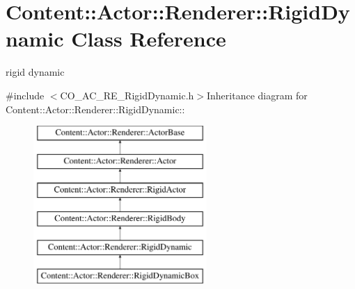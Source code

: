 \hypertarget{classContent_1_1Actor_1_1Renderer_1_1RigidDynamic}{
\section{Content::Actor::Renderer::RigidDynamic Class Reference}
\label{classContent_1_1Actor_1_1Renderer_1_1RigidDynamic}
}


rigid dynamic  


{\ttfamily \#include $<$CO\_\-AC\_\-RE\_\-RigidDynamic.h$>$}Inheritance diagram for Content::Actor::Renderer::RigidDynamic::\begin{figure}[H]
\begin{center}
\leavevmode
\includegraphics[height=6cm]{classContent_1_1Actor_1_1Renderer_1_1RigidDynamic}
\end{center}
\end{figure}
